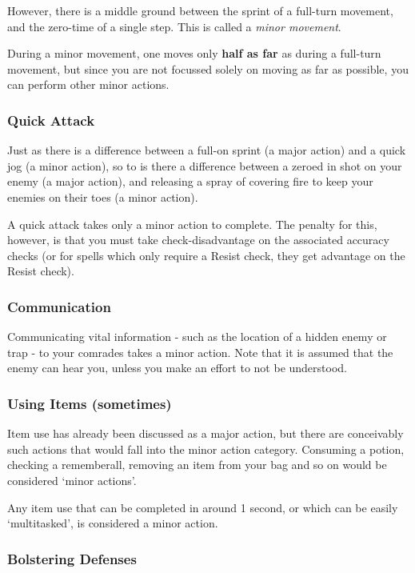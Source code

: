 However, there is a middle ground between the sprint of a full-turn movement, and the zero-time of a single step. This is called a {\it minor movement}. 

During a minor movement, one moves only {\bf half as far} as during a full-turn movement, but since you are not focussed solely on moving as far as possible, you can perform other minor actions. 

\subsubsection{Quick Attack}

Just as there is a difference between a full-on sprint (a major action) and a quick jog (a minor action), so to is there a difference between a zeroed in shot on your enemy (a major action), and releasing a spray of covering fire to keep your enemies on their toes (a minor action). 

A quick attack takes only a minor action to complete. The penalty for this, however, is that you must take check-disadvantage on the associated accuracy checks (or for spells which only require a Resist check, they get advantage on the Resist check). 


\subsubsection{Communication}

Communicating vital information - such as the location of a hidden enemy or trap - to your comrades takes a minor action. Note that it is assumed that the enemy can hear you, unless you make an effort to not be understood. 

\subsubsection{Using Items (sometimes)}

Item use has already been discussed as a major action, but there are conceivably such actions that would fall into the minor action category. Consuming a potion, checking a rememberall, removing an item from your bag and so on would be considered `minor actions'. 

Any item use that can be completed in around 1 second, or which can be easily `multitasked', is considered a minor action. 

\subsubsection{Bolstering Defenses}
 
